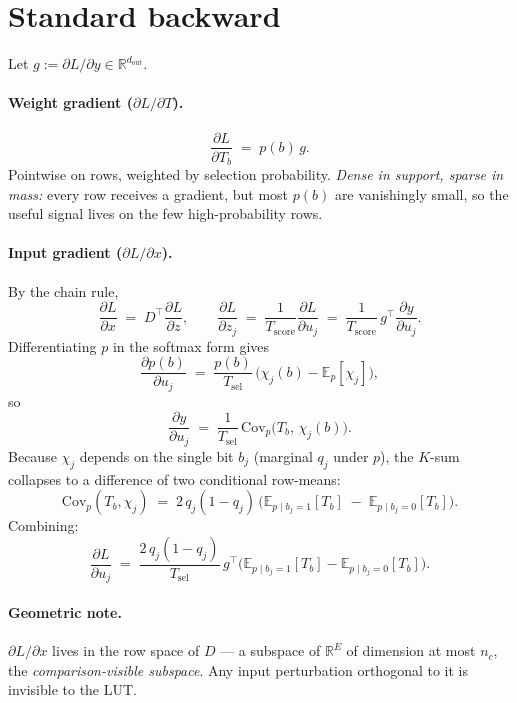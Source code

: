 \documentclass[11pt]{article}
\newcommand{\R}{\mathbb{R}}
\newcommand{\E}{\mathbb{E}}
\newcommand{\Cov}{\mathrm{Cov}}
\newcommand{\Tsel}{T_{\mathrm{sel}}}
\newcommand{\Tscore}{T_{\mathrm{score}}}
\newcommand{\dout}{d_{\mathrm{out}}}
\begin{document}
\section{Standard backward}
\label{sec:bwd}

Let $g := \partial L / \partial y \in \R^{\dout}$.

\paragraph{Weight gradient ($\partial L / \partial T$).}
\[
\frac{\partial L}{\partial T_b} \;=\; p(b)\, g.
\]
Pointwise on rows, weighted by selection probability. \emph{Dense in support, sparse in mass:} every row receives a gradient, but most $p(b)$ are vanishingly small, so the useful signal lives on the few high-probability rows.

\paragraph{Input gradient ($\partial L / \partial x$).} By the chain rule,
\[
\frac{\partial L}{\partial x} \;=\; D^\top \frac{\partial L}{\partial z}, \qquad
\frac{\partial L}{\partial z_j} \;=\; \frac{1}{\Tscore} \frac{\partial L}{\partial u_j} \;=\; \frac{1}{\Tscore}\, g^\top \frac{\partial y}{\partial u_j}.
\]
Differentiating $p$ in the softmax form gives
\[
\frac{\partial p(b)}{\partial u_j} \;=\; \frac{p(b)}{\Tsel}\,\big(\chi_j(b) - \E_p[\chi_j]\big),
\]
so
\[
\frac{\partial y}{\partial u_j} \;=\; \frac{1}{\Tsel}\, \Cov_p\!\big(T_b,\, \chi_j(b)\big).
\]
Because $\chi_j$ depends on the single bit $b_j$ (marginal $q_j$ under $p$), the $K$-sum collapses to a difference of two conditional row-means:
\[
\boxed{\;\Cov_p(T_b, \chi_j) \;=\; 2\, q_j(1 - q_j)\, \Big(\E_{p \mid b_j = 1}[T_b] \;-\; \E_{p \mid b_j = 0}[T_b]\Big).\;}
\]
Combining:
\[
\frac{\partial L}{\partial u_j} \;=\; \frac{2\, q_j(1-q_j)}{\Tsel}\, g^\top\!\big(\E_{p \mid b_j=1}[T_b] - \E_{p \mid b_j=0}[T_b]\big).
\]

\paragraph{Geometric note.} $\partial L / \partial x$ lives in the row space of $D$ --- a subspace of $\R^E$ of dimension at most $n_c$, the \emph{comparison-visible subspace}. Any input perturbation orthogonal to it is invisible to the LUT.

\end{document}
